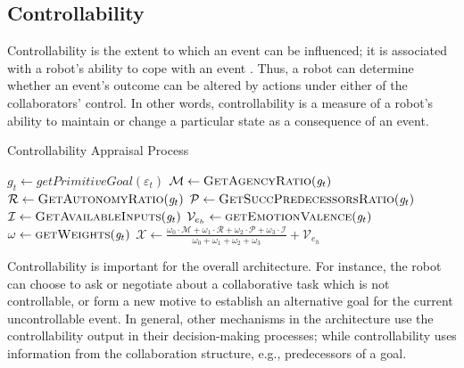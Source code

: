 \documentclass[12pt]{report}
\begin{document}
\subsection{Controllability}
\label{sec:controllability}
Controllability is the extent to which an event can be influenced; it is
associated with a robot's ability to cope with an event
\cite{gratch:domain-independent}. Thus, a robot can determine whether an event's
outcome can be altered by actions under either of the collaborators' control. In
other words, controllability is a measure of a robot's ability to maintain or
change a particular state as a consequence of an event.

\begin{algorithm}
	\caption{Controllability Appraisal Process}
	\label{alg:controllability}
	\begin{algorithmic}[1]
 			\State $\mathit{g}_{t} \gets \textit{getPrimitiveGoal}{(\varepsilon_t)}$
  			\Statex
			\State $\mathcal{M} \gets \Call{GetAgencyRatio}{\mathit{g}_{t}}$ 
			\State $\mathcal{R} \gets \Call{GetAutonomyRatio}{\mathit{g}_{t}}$
 			\Statex
			\State $\mathcal{P} \gets \Call{GetSuccPredecessorsRatio}{\mathit{g}_{t}}$
			\State $\mathcal{I} \gets \Call{GetAvailableInputs}{\mathit{g}_{t}}$
  			\Statex
			\State $\mathcal{V}_{e_h} \gets \Call{getEmotionValence}{\mathit{g}_{t}}$ 
			\State $\omega \gets \Call{getWeights}{\mathit{g}_{t}}$
			\Statex
			\State $\mathcal{X} \gets
			\frac{\omega_{0}\cdot \mathcal{M} + \omega_{1}\cdot \mathcal{R} +
			\omega_{2}\cdot \mathcal{P} + \omega_{3}\cdot \mathcal{I}}{\omega_{0} +
			\omega_{1} + \omega_{2} + \omega_{3}} + \mathcal{V}_{e_h}$
  			\Statex
 			\Statex
 				\State {}
			\Else 
 				\State {}
			\EndIf
		\EndFunction
	\end{algorithmic}
\end{algorithm}

Controllability is important for the overall architecture. For instance, the
robot can choose to ask or negotiate about a collaborative task which is not
controllable, or form a new motive to establish an alternative goal for the
current uncontrollable event. In general, other mechanisms in the architecture
use the controllability output in their decision-making processes; while
controllability uses information from the collaboration structure, e.g.,
predecessors of a goal.
\end{document}
